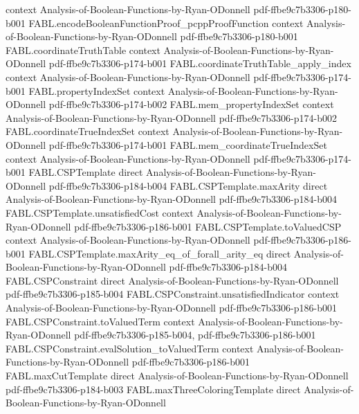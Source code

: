 \begin{theorem}
  {context}
  {Analysis-of-Boolean-Functions-by-Ryan-ODonnell}
  {pdf-ffbe9c7b3306-p180-b001}
\proofstep
  {FABL.encodeBooleanFunctionProof_pcppProofFunction}
  {context}
  {Analysis-of-Boolean-Functions-by-Ryan-ODonnell}
  {pdf-ffbe9c7b3306-p180-b001}
\proofstep
  {FABL.coordinateTruthTable}
  {context}
  {Analysis-of-Boolean-Functions-by-Ryan-ODonnell}
  {pdf-ffbe9c7b3306-p174-b001}
\proofstep
  {FABL.coordinateTruthTable_apply_index}
  {context}
  {Analysis-of-Boolean-Functions-by-Ryan-ODonnell}
  {pdf-ffbe9c7b3306-p174-b001}
\proofstep
  {FABL.propertyIndexSet}
  {context}
  {Analysis-of-Boolean-Functions-by-Ryan-ODonnell}
  {pdf-ffbe9c7b3306-p174-b002}
\proofstep
  {FABL.mem_propertyIndexSet}
  {context}
  {Analysis-of-Boolean-Functions-by-Ryan-ODonnell}
  {pdf-ffbe9c7b3306-p174-b002}
\proofstep
  {FABL.coordinateTrueIndexSet}
  {context}
  {Analysis-of-Boolean-Functions-by-Ryan-ODonnell}
  {pdf-ffbe9c7b3306-p174-b001}
\proofstep
  {FABL.mem_coordinateTrueIndexSet}
  {context}
  {Analysis-of-Boolean-Functions-by-Ryan-ODonnell}
  {pdf-ffbe9c7b3306-p174-b001}
\proofstep
  {FABL.CSPTemplate}
  {direct}
  {Analysis-of-Boolean-Functions-by-Ryan-ODonnell}
  {pdf-ffbe9c7b3306-p184-b004}
\proofstep
  {FABL.CSPTemplate.maxArity}
  {direct}
  {Analysis-of-Boolean-Functions-by-Ryan-ODonnell}
  {pdf-ffbe9c7b3306-p184-b004}
\proofstep
  {FABL.CSPTemplate.unsatisfiedCost}
  {context}
  {Analysis-of-Boolean-Functions-by-Ryan-ODonnell}
  {pdf-ffbe9c7b3306-p186-b001}
\proofstep
  {FABL.CSPTemplate.toValuedCSP}
  {context}
  {Analysis-of-Boolean-Functions-by-Ryan-ODonnell}
  {pdf-ffbe9c7b3306-p186-b001}
\proofstep
  {FABL.CSPTemplate.maxArity_eq_of_forall_arity_eq}
  {direct}
  {Analysis-of-Boolean-Functions-by-Ryan-ODonnell}
  {pdf-ffbe9c7b3306-p184-b004}
\proofstep
  {FABL.CSPConstraint}
  {direct}
  {Analysis-of-Boolean-Functions-by-Ryan-ODonnell}
  {pdf-ffbe9c7b3306-p185-b004}
\proofstep
  {FABL.CSPConstraint.unsatisfiedIndicator}
  {context}
  {Analysis-of-Boolean-Functions-by-Ryan-ODonnell}
  {pdf-ffbe9c7b3306-p186-b001}
\proofstep
  {FABL.CSPConstraint.toValuedTerm}
  {context}
  {Analysis-of-Boolean-Functions-by-Ryan-ODonnell}
  {pdf-ffbe9c7b3306-p185-b004,
    pdf-ffbe9c7b3306-p186-b001}
\proofstep
  {FABL.CSPConstraint.evalSolution_toValuedTerm}
  {context}
  {Analysis-of-Boolean-Functions-by-Ryan-ODonnell}
  {pdf-ffbe9c7b3306-p186-b001}
\proofstep
  {FABL.maxCutTemplate}
  {direct}
  {Analysis-of-Boolean-Functions-by-Ryan-ODonnell}
  {pdf-ffbe9c7b3306-p184-b003}
\proofstep
  {FABL.maxThreeColoringTemplate}
  {direct}
  {Analysis-of-Boolean-Functions-by-Ryan-ODonnell}

\end{theorem}
